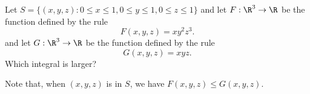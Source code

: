 \documentclass{ximera}
\author{Jim Fowler}
\begin{document}
\begin{exercise}
  Let $S=\{(x,y,z):0\le x\le 1, 0\le y\le 1, 0\le z\le 1\}$ and let $F
  : \R^3 \to \R$ be the function defined by the rule
  \[
    F(x,y,z) = x y^2 z^3.
  \]
  and let $G : \R^3 \to \R$ be the function defined by the rule
  \[
    G(x,y,z) = x y z.
  \]
  Which integral is larger?
  \begin{multipleChoice}
  \end{multipleChoice}
  
  \begin{hint}
    Note that, when $(x,y,z)$ is in $S$, we have $F(x,y,z) \leq
    G(x,y,z)$.
  \end{hint}
  
\end{exercise}
\end{document}
